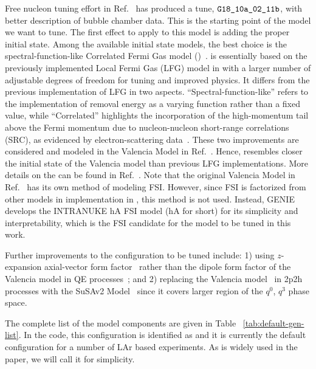 Free nucleon tuning effort in Ref.~\cite{GENIE:2021zuu} has produced a tune, $\texttt{G18\_10a\_02\_11b}$, with better description of bubble chamber data. 
This is the starting point of the model we want to tune. 
The first effect to apply to this model is adding the proper initial state. 
Among the available \genie initial state models, the best choice is the spectral-function-like Correlated Fermi Gas model (\sfcfg)~\cite{sfcfg-talk,sfcfg-GitHubCommit,GENIE:2021npt}. 
\sfcfg is essentially based on the previously implemented Local Fermi Gas (LFG) model in \genie with a larger number of adjustable degrees of freedom for tuning and improved physics. 
It differs from the previous implementation of LFG in two aspects. 
``Spectral-function-like'' refers to the implementation of removal energy as a varying function rather than a fixed value, while ``Correlated'' highlights the incorporation of the high-momentum tail above the Fermi momentum due to nucleon-nucleon short-range correlations (SRC), as evidenced by electron-scattering data~\cite{PhysRevLett.96.082501}.
These two improvements are considered and modeled in the Valencia Model in Ref.~\cite{Nieves:2004wx}.
Hence, \sfcfg resembles closer the initial state of the Valencia model than previous LFG implementations.
More details on the \sfcfg can be found in Ref.~\cite{GENIE:2021npt}. 
Note that the original Valencia Model in Ref.~\cite{Nieves:2004wx} has its own method of modeling FSI. 
However, since FSI is factorized from other models in implementation in \genie, this method is not used.
Instead, GENIE develops the INTRANUKE hA FSI model (hA for short) for its simplicity and interpretability, which is the FSI candidate for the model to be tuned in this work.

Further improvements to the configuration to be tuned include: 1) using $z$-expansion axial-vector form factor~\cite{Hill:2010yb} rather than the dipole form factor of the Valencia model in QE processes~\cite{Nieves:2004wx}; and 2) replacing the Valencia model~\cite{Nieves:2011pp} in 2p2h processes with the SuSAv2 Model~\cite{Gonzalez-Jimenez:2014eqa} since it covers larger region of the $q^0$, $q^3$ phase space.

The complete list of the model components are given in Table ~\ref{tab:default-gen-list}. 
In the \genie code, this configuration is identified as \newtune and it is currently the default \genie configuration for a number of LAr based experiments. 
As \newtune is widely used in the paper, we will call it \gZero for simplicity. 

